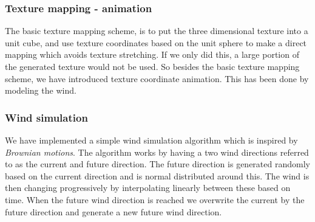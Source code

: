\subsubsection{Texture mapping - animation}
The basic texture mapping scheme, is to put the three dimensional
texture into a unit cube, and use texture coordinates based on the
unit sphere to make a direct mapping which avoids texture stretching.
%
If we only did this, a large portion of the generated texture would
not be used.
%
So besides the basic texture mapping scheme, we have introduced
texture coordinate animation. This has been done by modeling the wind.

\subsubsection{Wind simulation}
We have implemented a simple wind simulation algorithm which is
inspired by \emph{Brownian motions}.
The algorithm works by having a two wind directions referred to as the
current and future direction. The future direction is generated
randomly based on the current direction and is normal distributed
around this. The wind is then changing progressively by interpolating
linearly between these based on time. When the future wind direction is
reached we overwrite the current by the future direction and generate
a new future wind direction.


